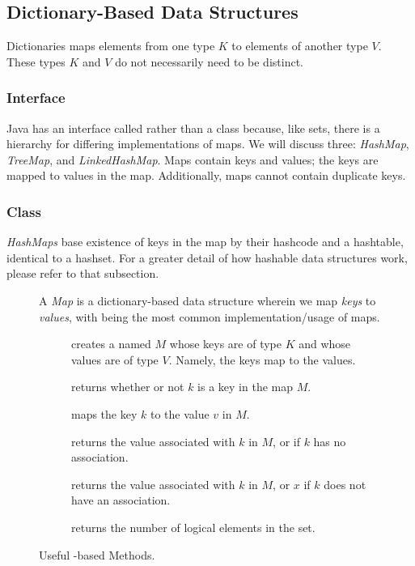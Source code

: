 \subsection*{Dictionary-Based Data Structures}
Dictionaries maps elements from one type $K$ to elements of another type $V$. These types $K$ and $V$ do not necessarily need to be distinct. 

\subsubsection*{ Interface}
Java has an interface called  rather than a class because, like sets, there is a hierarchy for differing implementations of maps. We will discuss three: \textit{HashMap}, \textit{TreeMap}, and \textit{LinkedHashMap}. Maps contain keys and values; the keys are mapped to values in the map. Additionally, maps cannot contain duplicate keys.

\subsubsection*{ Class}
\textit{HashMaps} base existence of keys in the map by their hashcode and a hashtable, identical to a hashset. For a greater detail of how hashable data structures work, please refer to that subsection.
\begin{figure}[tp]
  \small
  \begin{tcolorbox}[title=Java Maps]
    A \textit{Map} is a dictionary-based data structure wherein we map \textit{keys} to \textit{values}, with  being the most common implementation/usage of maps.
    \vspace{2ex}
  \begin{description}
    \item [] creates a  named $M$ whose keys are of type $K$ and whose values are of type $V$. Namely, the keys map to the values.
     \item [] returns whether or not $k$ is a key in the map $M$.
     \item [] maps the key $k$ to the value $v$ in $M$.
     \item [] returns the value associated with $k$ in $M$, or  if $k$ has no association.
     \item [] returns the value associated with $k$ in $M$, or $x$ if $k$ does not have an association.
    \item [] returns the number of logical elements in the set.
  \end{description}
\end{tcolorbox}
  \caption{Useful -based Methods.}
  \label{fig:hashmap}
\end{figure}

